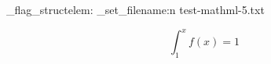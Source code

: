 \documentclass{article}
\begin{document}
\ExplSyntaxOn
\luamml_flag_structelem:  \luamml_set_filename:n {test-mathml-5.txt} 
\ExplSyntaxOff

\begin{equation} \int_1^x f(x) = 1 \end{equation}
\end{document}
